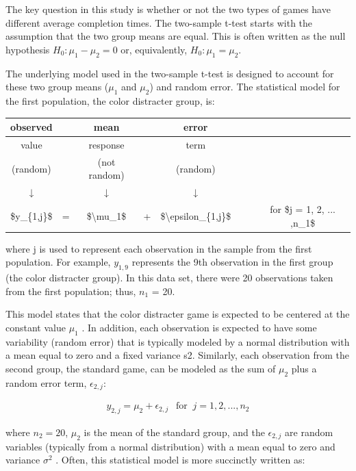 \documentclass[
]{report}
\begin{document}
The key question in this study is whether or not the two types of games have different average completion times. The two-sample t-test starts with the assumption that the two group means are equal. This is often written as the null hypothesis \(H_0 : \mu_1 - \mu_2 = 0\) or, equivalently, \(H_0 : \mu_1 = \mu_2\).

The underlying model used in the two-sample t-test is designed to account for these two group means (\(\mu_1\) and \(\mu_2\)) and random error. The statistical model for the first population, the color distracter group, is:

\begin{table}
\centering
\begin{tabular}{>{}c|>{}c|>{}c|>{}c|>{}c|>{}c|>{}c|>{}c}
\hline
observed &  & mean &  & error &  &  & \\
\hline
value &  & response &  & term &  &  & \\
\hline
(random) &  & (not random) &  & (random) &  &  & \\
\hline
↓ &  & ↓ &  & ↓ &  &  & \\
\hline
\$y\_\{1,j\}\$ & = & \$\textbackslash{}mu\_1\$ & + & \$\textbackslash{}epsilon\_\{1,j\}\$ &  &  & for \$j = 1, 2, ... ,n\_1\$\\
\hline
\end{tabular}
\end{table}

where j is used to represent each observation in the sample from the first population. For example, \(y_{1, 9}\) represents the 9th observation in the first group (the color distracter group). In this data set, there were 20 observations taken from the first population; thus, \(n_1\) = 20.

This model states that the color distracter game is expected to be centered at the constant value \(\mu_1\) . In addition, each observation is expected to have some variability (random error) that is typically modeled by a normal distribution with a mean equal to zero and a fixed variance s2. Similarly, each observation from the second group, the standard game, can be modeled as the sum of \(\mu_2\) plus a random error term, \(\epsilon_{2, j}\):

\begin{align}
y_{2, j} = \mu_2 + \epsilon_{2, j}  ~~\text{ for }~ j = 1, 2, ... ,n_2
\end{align}

where \(n_2 = 20\), \(\mu_2\) is the mean of the standard group, and the \(\epsilon_{2, j}\) are random variables (typically from a
normal distribution) with a mean equal to zero and variance \(\sigma^2\) . Often, this statistical model is more succinctly written as:
\end{document}
